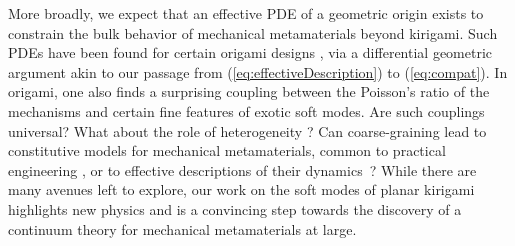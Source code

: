 \documentclass[aps,prl,twocolumn,superscriptaddress]{revtex4-1}
\begin{document}
More broadly, we expect that an effective PDE of a geometric origin exists to constrain the bulk behavior of mechanical metamaterials beyond kirigami. Such PDEs have been found for certain origami designs \cite{nassar2017curvature,lebee2018fitting}, via a differential geometric argument akin to our passage from (\ref{eq:effectiveDescription}) to (\ref{eq:compat}). In origami, one also finds a surprising coupling between the Poisson's ratio of the mechanisms and certain fine features of  exotic soft modes. Are such couplings universal? What about the role of heterogeneity \cite{Dudte2016,Celli2018,Choi2019,dang2022inverse}? Can coarse-graining lead to constitutive models for mechanical metamaterials, common to practical engineering \cite{khajehtourian2021continuum,mcmahan2021effective}, or to effective descriptions of their dynamics~\cite{Deng2017}? While there are many avenues left to explore, our work on the soft modes of planar kirigami highlights new physics and is a convincing step towards the discovery of a continuum theory for mechanical metamaterials at large.



\end{document}
